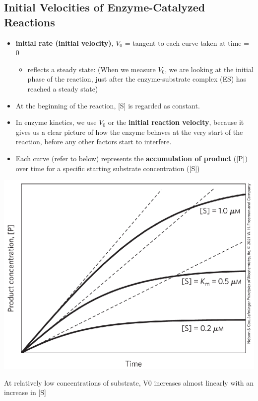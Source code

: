 \documentclass[10pt]{article}
\begin{document}
\subsection*{Initial Velocities of Enzyme-Catalyzed Reactions}
\begin{itemize}
    \item \textbf{initial rate (initial velocity)}, \textbf{$V_0$} = tangent to each curve taken at time = 0
    \begin{itemize}
        \item reflects a steady state:  (When we measure $V_0$, we are looking at the initial phase of the reaction, just after the enzyme-substrate complex (ES) has reached a steady state)
    \end{itemize}
    \item At the beginning of the reaction, [S] is regarded as constant.
    \item In enzyme kinetics, we use $V_0$ or the \textbf{initial reaction velocity}, because it gives us a clear picture of how the enzyme behaves at the very start of the reaction, before any other factors start to interfere.
    \item Each curve (refer to below) represents the \textbf{accumulation of product} ([P]) over time for a specific starting substrate concentration ([S])
\end{itemize}
\begin{center}
    \includegraphics*[scale=0.6]{L1_4.png}
\end{center}
At relatively low concentrations of substrate, V0 increases almost linearly with an increase in [S]
\end{document}
